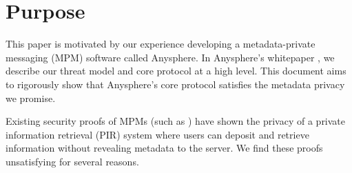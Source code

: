 \section{Purpose}
\label{sec:purpose}
This paper is motivated by our experience developing a metadata-private messaging (MPM) software called Anysphere. In Anysphere's whitepaper \cite[Section 3]{whitepaper}, we describe our threat model and core protocol at a high level. This document aims to rigorously show that Anysphere's core protocol satisfies the metadata privacy we promise. 

Existing security proofs of MPMs (such as \cite{corrigan2010dissent, corrigan2015riposte, angel2016unobservable, ahmad2021addra}) have shown the privacy of a private information retrieval (PIR) system where users can deposit and retrieve information without revealing metadata to the server. We find these proofs unsatisfying for several reasons.
